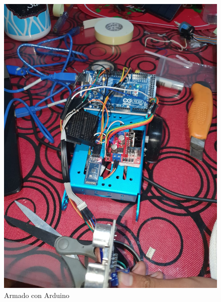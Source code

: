 \documentclass[11pt,a4paper]{article}
\begin{document}
\newpage
\begin{figure}[hbtp]
\centering
\includegraphics[scale=0.15]{Pictures/Armado0.jpeg}
\caption{Armado con Arduino}
\end{figure}
\end{document}
